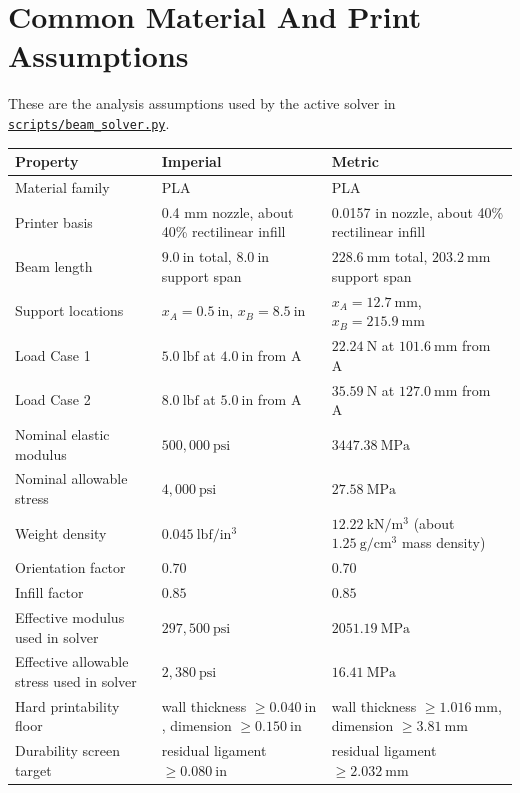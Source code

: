 \documentclass[11pt]{article}
\newcommand{\pathlink}[1]{\href{run:#1}{\nolinkurl{#1}}}
\begin{document}
\section*{Common Material And Print Assumptions}

These are the analysis assumptions used by the active solver in
\pathlink{scripts/beam_solver.py}.

\small
\begin{tabularx}{\textwidth}{@{}p{}YY@{}}
\toprule
Property & Imperial & Metric \\
\midrule
Material family & PLA & PLA \\
Printer basis & 0.4 mm nozzle, about 40\% rectilinear infill & 0.0157 in nozzle, about 40\% rectilinear infill \\
Beam length & \(9.0\ \mathrm{in}\) total, \(8.0\ \mathrm{in}\) support span & \(228.6\ \mathrm{mm}\) total, \(203.2\ \mathrm{mm}\) support span \\
Support locations & \(x_A=0.5\ \mathrm{in}\), \(x_B=8.5\ \mathrm{in}\) & \(x_A=12.7\ \mathrm{mm}\), \(x_B=215.9\ \mathrm{mm}\) \\
Load Case 1 & \(5.0\ \mathrm{lbf}\) at \(4.0\ \mathrm{in}\) from A & \(22.24\ \mathrm{N}\) at \(101.6\ \mathrm{mm}\) from A \\
Load Case 2 & \(8.0\ \mathrm{lbf}\) at \(5.0\ \mathrm{in}\) from A & \(35.59\ \mathrm{N}\) at \(127.0\ \mathrm{mm}\) from A \\
Nominal elastic modulus & \(500{,}000\ \mathrm{psi}\) & \(3447.38\ \mathrm{MPa}\) \\
Nominal allowable stress & \(4{,}000\ \mathrm{psi}\) & \(27.58\ \mathrm{MPa}\) \\
Weight density & \(0.045\ \mathrm{lbf/in^3}\) & \(12.22\ \mathrm{kN/m^3}\) (about \(1.25\ \mathrm{g/cm^3}\) mass density) \\
Orientation factor & \(0.70\) & \(0.70\) \\
Infill factor & \(0.85\) & \(0.85\) \\
Effective modulus used in solver & \(297{,}500\ \mathrm{psi}\) & \(2051.19\ \mathrm{MPa}\) \\
Effective allowable stress used in solver & \(2{,}380\ \mathrm{psi}\) & \(16.41\ \mathrm{MPa}\) \\
Hard printability floor & wall thickness \(\ge 0.040\ \mathrm{in}\), dimension \(\ge 0.150\ \mathrm{in}\) & wall thickness \(\ge 1.016\ \mathrm{mm}\), dimension \(\ge 3.81\ \mathrm{mm}\) \\
Durability screen target & residual ligament \(\ge 0.080\ \mathrm{in}\) & residual ligament \(\ge 2.032\ \mathrm{mm}\) \\
\bottomrule
\end{tabularx}
\normalsize
\end{document}
